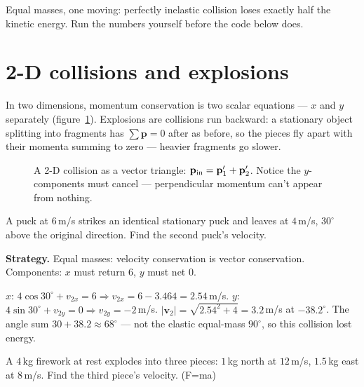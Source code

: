 \begin{checkpoint}
Equal masses, one moving: perfectly inelastic collision loses exactly half
the kinetic energy. Run the numbers yourself before the code below does.
\end{checkpoint}

\section{2-D collisions and explosions}\label{sec:mom-2d}

In two dimensions, momentum conservation is two scalar equations --- $x$
and $y$ separately (figure~\ref{fig:glance}). Explosions are collisions run
backward: a stationary object splitting into fragments has
$\sum\mathbf p=0$ after as before, so the pieces fly apart with their
momenta summing to zero --- heavier fragments go slower.

\begin{figure}[htbp]\centering

\caption{A 2-D collision as a vector triangle:
$\mathbf p_{\rm in}=\mathbf p_1'+\mathbf p_2'$. Notice the $y$-components
must cancel --- perpendicular momentum can't appear from nothing.}
\label{fig:glance}
\end{figure}

\begin{example}\label{ex:glance}
A puck at $6$\,m/s strikes an identical stationary puck and leaves at
$4$\,m/s, $30^{\circ}$ above the original direction. Find the second puck's
velocity.
\par\smallskip
\textbf{Strategy.} Equal masses: velocity conservation is vector
conservation. Components: $x$ must return $6$, $y$ must net $0$.
\begin{solution}
$x$: $4\cos30^{\circ}+v_{2x}=6 \Rightarrow v_{2x}=6-3.464=2.54$\,m/s.
$y$: $4\sin30^{\circ}+v_{2y}=0 \Rightarrow v_{2y}=-2$\,m/s.
$|\mathbf v_2|=\sqrt{2.54^{2}+4}=3.2$\,m/s at $-38.2^{\circ}$. The angle
sum $30+38.2\approx68^{\circ}$ --- not the elastic equal-mass
$90^{\circ}$, so this collision lost energy. \checkmark
\end{solution}
\end{example}

\begin{exercise}[medium]
A $4$\,kg firework at rest explodes into three pieces: $1$\,kg north at
$12$\,m/s, $1.5$\,kg east at $8$\,m/s. Find the third piece's velocity.
(F=ma)
\end{exercise}

